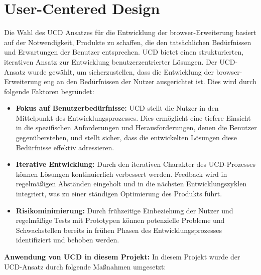 \section{User-Centered Design}

Die Wahl des \ac{UCD} Ansatzes für die Entwicklung der \gls{browser}-Erweiterung basiert auf der Notwendigkeit, Produkte zu schaffen, die den tatsächlichen Bedürfnissen und Erwartungen der Benutzer entsprechen. 
\ac{UCD} bietet einen strukturierten, iterativen Ansatz zur Entwicklung benutzerzentrierter Lösungen.
Der \ac{UCD}-Ansatz wurde gewählt, um sicherzustellen, dass die Entwicklung der \gls{browser}-Erweiterung eng an den Bedürfnissen der Nutzer ausgerichtet ist. Dies wird durch folgende Faktoren begründet:

\begin{itemize}
    \item \textbf{Fokus auf Benutzerbedürfnisse:} \ac{UCD} stellt die Nutzer in den Mittelpunkt des Entwicklungsprozesses. Dies ermöglicht eine tiefere Einsicht in die spezifischen Anforderungen und Herausforderungen, denen die Benutzer gegenüberstehen, und stellt sicher, dass die entwickelten Lösungen diese Bedürfnisse effektiv adressieren.
    \item \textbf{Iterative Entwicklung:} Durch den iterativen Charakter des \ac{UCD}-Prozesses können Lösungen kontinuierlich verbessert werden. Feedback wird in regelmäßigen Abständen eingeholt und in die nächsten Entwicklungszyklen integriert, was zu einer ständigen Optimierung des Produkts führt.
    \item \textbf{Risikominimierung:} Durch frühzeitige Einbeziehung der Nutzer und regelmäßige Tests mit Prototypen können potenzielle Probleme und Schwachstellen bereits in frühen Phasen des Entwicklungsprozesses identifiziert und behoben werden.
\end{itemize}

\textbf{Anwendung von \ac{UCD} in diesem Projekt:}
In diesem Projekt wurde der \ac{UCD}-Ansatz durch folgende Maßnahmen umgesetzt:


